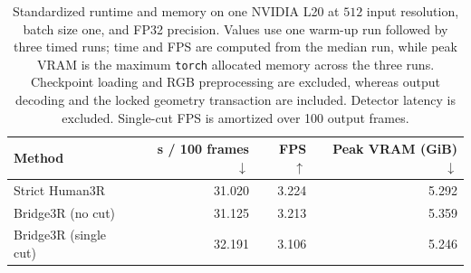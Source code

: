 \begin{table}[t]
  \centering
  \small
  \setlength{\tabcolsep}{4.5pt}
  \caption{Standardized runtime and memory on one NVIDIA L20 at $512$ input
  resolution, batch size one, and FP32 precision. Values use one warm-up run
  followed by three timed runs; time and FPS are computed from the median run,
  while peak VRAM is the maximum \texttt{torch} allocated memory across the
  three runs. Checkpoint loading and RGB preprocessing are excluded, whereas
  output decoding and the locked geometry transaction are included. Detector
  latency is excluded. Single-cut FPS is amortized over 100 output frames.}
  \label{tab:standardized-runtime-memory}
  \begin{tabular}{lrrr}
    \toprule
    Method & s / 100 frames $\downarrow$ & FPS $\uparrow$ & Peak VRAM (GiB) $\downarrow$ \\
    \midrule
    Strict Human3R & 31.020 & 3.224 & 5.292 \\
    Bridge3R (no cut) & 31.125 & 3.213 & 5.359 \\
    Bridge3R (single cut) & 32.191 & 3.106 & 5.246 \\
    \bottomrule
  \end{tabular}
\end{table}
